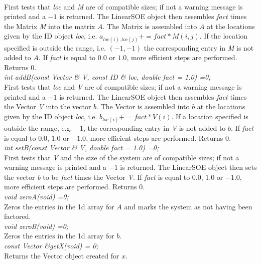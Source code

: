  \\
First tests that {\em loc} and {\em M} are of compatible sizes; if not
a warning message is printed and a $-1$ is returned. The LinearSOE
object then assembles {\em fact} times the Matrix {\em 
M} into the matrix $A$. The Matrix is assembled into $A$ at the
locations given by the ID object {\em loc}, i.e. $a_{loc(i),loc(j)} +=
fact * M(i,j)$. If the location specified is outside the range,
i.e. $(-1,-1)$ the corresponding entry in {\em M} is not added to
$A$. If {\em fact} is equal to $0.0$ or $1.0$, more efficient steps
are performed. Returns $0$.  \\


{\em int addB(const Vector \& V, const ID \& loc,
double fact = 1.0) =0;} \\
First tests that {\em loc} and {\em V} are of compatible sizes; if not
a warning message is printed and a $-1$ is returned. The LinearSOE
object then assembles {\em fact} times the Vector {\em V} into
the vector $b$. The Vector is assembled into $b$ at the locations
given by the ID object {\em loc}, i.e. $b_{loc(i)} += fact * V(i)$. If a
location specified is outside the range, e.g. $-1$, the corresponding
entry in {\em V} is not added to $b$. If {\em fact} is equal to $0.0$,
$1.0$ or $-1.0$, more efficient steps are performed. Returns $0$. \\

{\em int setB(const Vector \& V, double fact = 1.0) =0;} \\
First tests that {\em V} and the size of the system are of compatible
sizes; if not a warning message is printed and a $-1$ is returned. The
LinearSOE object then sets the vector {\em b} to be {\em fact} times
the Vector {\em V}. If {\em fact} is equal to $0.0$, $1.0$ or $-1.0$,
more efficient steps are performed. Returns $0$. \\ 

{\em void zeroA(void) =0;} \\
Zeros the entries in the 1d array for $A$ and marks the system as not
having been factored. \\

{\em void zeroB(void) =0;} \\
Zeros the entries in the 1d array for $b$. \\

{\em const Vector \&getX(void) = 0;} \\
Returns the Vector object created for $x$. \\

